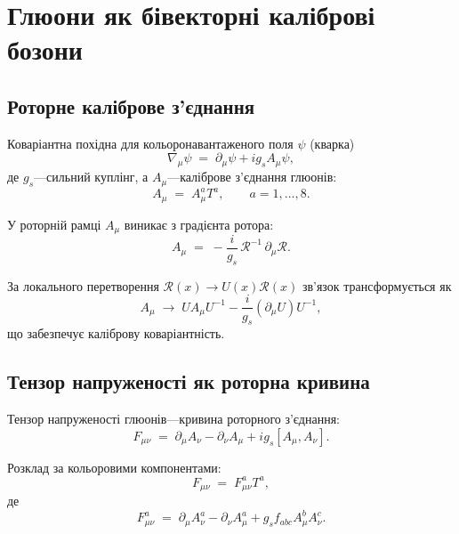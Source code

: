 \documentclass[11pt,a4paper]{article}
\newcommand{\Rotor}{\mathcal{R}}
\newcommand{\D}{\nabla}
\theoremstyle{definition}
\theoremstyle{plain}
\theoremstyle{remark}
\begin{document}
\vspace{1em}

\section{Глюони як бівекторні каліброві бозони}
\label{sec:gluons}

\subsection{Роторне каліброве з’єднання}

Коваріантна похідна для кольоронавантаженого поля $\psi$ (кварка)
\begin{equation}
\D_\mu \psi \;=\; \partial_\mu \psi + ig_s A_\mu \psi,
\label{eq:covariant-derivative}
\end{equation}
де $g_s$—сильний куплінг, а $A_\mu$—каліброве з’єднання глюонів:
\begin{equation}
A_\mu \;=\; A_\mu^a T^a, \qquad a=1,\ldots,8.
\label{eq:gluon-connection}
\end{equation}

У роторній рамці $A_\mu$ виникає з градієнта ротора:
\begin{equation}
A_\mu \;=\; -\frac{i}{g_s}\,\Rotor^{-1}\,\partial_\mu\Rotor.
\label{eq:rotor-connection}
\end{equation}

За локального перетворення $\Rotor(x)\to U(x)\Rotor(x)$ зв’язок трансформується як
\begin{equation}
A_\mu \;\to\; U A_\mu U^{-1} - \frac{i}{g_s}(\partial_\mu U) U^{-1},
\end{equation}
що забезпечує каліброву коваріантність.

\subsection{Тензор напруженості як роторна кривина}

Тензор напруженості глюонів—кривина роторного з’єднання:
\begin{equation}
F_{\mu\nu} \;=\; \partial_\mu A_\nu - \partial_\nu A_\mu + ig_s [A_\mu, A_\nu].
\label{eq:field-strength}
\end{equation}

Розклад за кольоровими компонентами:
\begin{equation}
F_{\mu\nu} \;=\; F_{\mu\nu}^a T^a,
\end{equation}
де
\begin{equation}
F_{\mu\nu}^a \;=\; \partial_\mu A_\nu^a - \partial_\nu A_\mu^a + g_s f_{abc} A_\mu^b A_\nu^c.
\label{eq:gluon-field-strength}
\end{equation}
\end{document}
